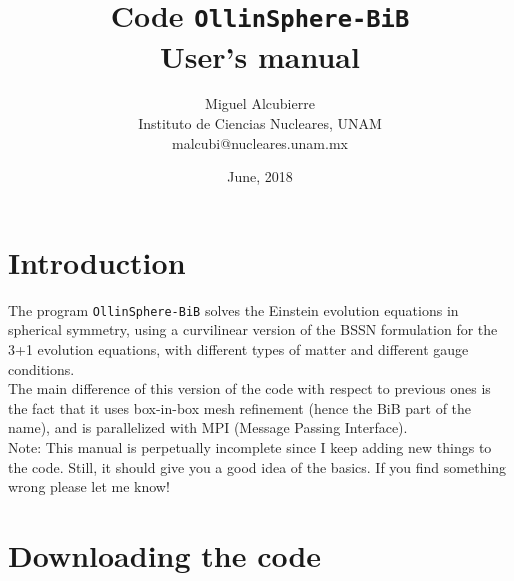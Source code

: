 \documentclass[12pt]{article}
\begin{document}

\renewcommand{\theequation}{\thesection.\arabic{equation}}

\parindent 0mm



\title{Code \texttt{OllinSphere-BiB} \\ User's manual}

\author{Miguel Alcubierre \\
Instituto de Ciencias Nucleares, UNAM \\
malcubi@nucleares.unam.mx}

\date{June, 2018}

\maketitle

\tableofcontents



\pagebreak

\section{Introduction}

The program \texttt{OllinSphere-BiB} solves the Einstein evolution
equations in spherical symmetry, using a curvilinear version of the
BSSN formulation for the 3+1 evolution equations, with different types
of matter and different gauge conditions. \\

The main difference of this version of the code with respect to
previous ones is the fact that it uses box-in-box mesh refinement
(hence the BiB part of the name), and is parallelized with MPI
(Message Passing Interface). \\

Note: This manual is perpetually incomplete since I keep adding new
things to the code. Still, it should give you a good idea of the
basics. If you find something wrong please let me know! \\



\section{Downloading the code}
\end{document}
